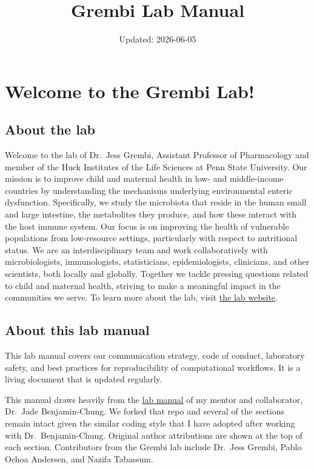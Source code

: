 \documentclass[
]{book}
\title{Grembi Lab Manual}
\author{}
\date{\vspace{-2.5em}Updated: 2026-06-05}
\begin{document}
\maketitle

{
\setcounter{tocdepth}{1}
\tableofcontents
}
\chapter{Welcome to the Grembi Lab!}\label{welcome-to-the-grembi-lab}

\section{About the lab}\label{about-the-lab}

Welcome to the lab of Dr.~Jess Grembi, Assistant Professor of Pharmacology and member of the Huck Institutes of the Life Sciences at Penn State University. Our mission is to improve child and maternal health in low- and middle-income countries by understanding the mechanisms underlying environmental enteric dysfunction. Specifically, we study the microbiota that reside in the human small and large intestine, the metabolites they produce, and how these interact with the host immune system. Our focus is on improving the health of vulnerable populations from low-resource settings, particularly with respect to nutritional status. We are an interdisciplinary team and work collaboratively with microbiologists, immunologists, statisticians, epidemiologists, clinicians, and other scientists, both locally and globally. Together we tackle pressing questions related to child and maternal health, striving to make a meaningful impact in the communities we serve. To learn more about the lab, visit \href{https://jgrembi.github.io}{the lab website}.

\section{About this lab manual}\label{about-this-lab-manual}

This lab manual covers our communication strategy, code of conduct, laboratory safety, and best practices for reproducibility of computational workflows. It is a living document that is updated regularly.

This manual draws heavily from the \href{https://jadebc.github.io/lab-manual/}{lab manual} of my mentor and collaborator, Dr.~Jade Benjamin-Chung. We forked that repo and several of the sections remain intact given the similar coding style that I have adopted after working with Dr.~Benjamin-Chung. Original author attributions are shown at the top of each section.
Contributors from the Grembi lab include Dr.~Jess Grembi, Pablo Ochoa Andersen, and Nazifa Tabassum.
\end{document}
